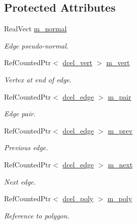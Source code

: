 \subsection*{Protected Attributes}
\begin{DoxyCompactItemize}
\item 
Real\+Vect \hyperlink{classdcel__edge_afcc9b6837856744b4f74639431820d54}{m\+\_\+normal}
\begin{DoxyCompactList}\small\item\em Edge pseudo-\/normal. \end{DoxyCompactList}\item 
Ref\+Counted\+Ptr$<$ \hyperlink{classdcel__vert}{dcel\+\_\+vert} $>$ \hyperlink{classdcel__edge_ad4b3ec662a3dd8290f0514577605577d}{m\+\_\+vert}
\begin{DoxyCompactList}\small\item\em Vertex at end of edge. \end{DoxyCompactList}\item 
Ref\+Counted\+Ptr$<$ \hyperlink{classdcel__edge}{dcel\+\_\+edge} $>$ \hyperlink{classdcel__edge_a63193774b8173e4538f6301971377d35}{m\+\_\+pair}
\begin{DoxyCompactList}\small\item\em Edge pair. \end{DoxyCompactList}\item 
Ref\+Counted\+Ptr$<$ \hyperlink{classdcel__edge}{dcel\+\_\+edge} $>$ \hyperlink{classdcel__edge_a768565a1f3996c8c5d2db6a66203669b}{m\+\_\+prev}
\begin{DoxyCompactList}\small\item\em Previous edge. \end{DoxyCompactList}\item 
Ref\+Counted\+Ptr$<$ \hyperlink{classdcel__edge}{dcel\+\_\+edge} $>$ \hyperlink{classdcel__edge_a7a847adf0cc11c2a66fcdca1a3bdb941}{m\+\_\+next}
\begin{DoxyCompactList}\small\item\em Next edge. \end{DoxyCompactList}\item 
Ref\+Counted\+Ptr$<$ \hyperlink{classdcel__poly}{dcel\+\_\+poly} $>$ \hyperlink{classdcel__edge_a2a7745d9e39c1162ad5d8af1f16c9b57}{m\+\_\+poly}
\begin{DoxyCompactList}\small\item\em Reference to polygon. \end{DoxyCompactList}\end{DoxyCompactItemize}


